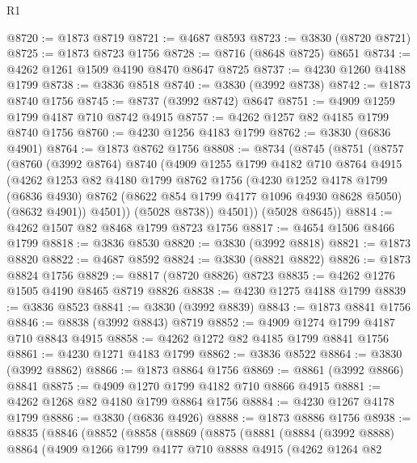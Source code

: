 \begin{lexlean}{R1}
\begin{coremodule}
@8720 := @1873 @8719
@8721 := @4687 @8593
@8723 := @3830 (@8720 @8721)
@8725 := @1873 @8723 @1756
@8728 := @8716 (@8648 @8725) @8651
@8734 := @4262 @1261 @1509 @4190 @8470 @8647 @8725
@8737 := @4230 @1260 @4188 @1799
@8738 := @3836 @8518
@8740 := @3830 (@3992 @8738)
@8742 := @1873 @8740 @1756
@8745 := @8737 (@3992 @8742) @8647
@8751 := @4909 @1259 @1799 @4187 @710 @8742 @4915
@8757 := @4262 @1257 @82 @4185 @1799 @8740 @1756
@8760 := @4230 @1256 @4183 @1799
@8762 := @3830 (@6836 @4901)
@8764 := @1873 @8762 @1756
@8808 := @8734
    (@8745
      (@8751
        (@8757
          (@8760
            (@3992 @8764)
            @8740
            (@4909
              @1255
              @1799
              @4182
              @710
              @8764
              @4915
              (@4262
                @1253
                @82
                @4180
                @1799
                @8762
                @1756
                (@4230
                  @1252
                  @4178
                  @1799
                  (@6836 @4930)
                  @8762
                  (@8622 @854 @1799 @4177 @1096 @4930 @8628 @5050)
                  (@8632 @4901))
                @4501))
            (@5028 @8738))
          @4501))
      (@5028 @8645))
@8814 := @4262 @1507 @82 @8468 @1799 @8723 @1756
@8817 := @4654 @1506 @8466 @1799
@8818 := @3836 @8530
@8820 := @3830 (@3992 @8818)
@8821 := @1873 @8820
@8822 := @4687 @8592
@8824 := @3830 (@8821 @8822)
@8826 := @1873 @8824 @1756
@8829 := @8817 (@8720 @8826) @8723
@8835 := @4262 @1276 @1505 @4190 @8465 @8719 @8826
@8838 := @4230 @1275 @4188 @1799
@8839 := @3836 @8523
@8841 := @3830 (@3992 @8839)
@8843 := @1873 @8841 @1756
@8846 := @8838 (@3992 @8843) @8719
@8852 := @4909 @1274 @1799 @4187 @710 @8843 @4915
@8858 := @4262 @1272 @82 @4185 @1799 @8841 @1756
@8861 := @4230 @1271 @4183 @1799
@8862 := @3836 @8522
@8864 := @3830 (@3992 @8862)
@8866 := @1873 @8864 @1756
@8869 := @8861 (@3992 @8866) @8841
@8875 := @4909 @1270 @1799 @4182 @710 @8866 @4915
@8881 := @4262 @1268 @82 @4180 @1799 @8864 @1756
@8884 := @4230 @1267 @4178 @1799
@8886 := @3830 (@6836 @4926)
@8888 := @1873 @8886 @1756
@8938 := @8835
    (@8846
      (@8852
        (@8858
          (@8869
            (@8875
              (@8881
                (@8884
                  (@3992 @8888)
                  @8864
                  (@4909
                    @1266
                    @1799
                    @4177
                    @710
                    @8888
                    @4915
                    (@4262
                      @1264
                      @82

\end{coremodule}
\end{lexlean}
